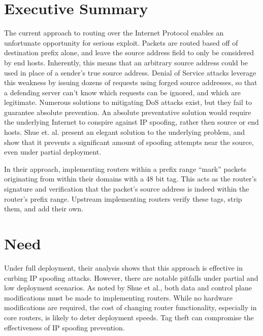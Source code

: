 \documentclass[12pt]{article} %
\begin{document}

\newpage %



\section{Executive Summary}
	The current approach to routing over the Internet Protocol enables an unfortunate opportunity for serious exploit. Packets are routed based off of destination prefix alone, and leave the source address field to only be considered by end hosts. Inherently, this means that an arbitrary source address could be used in place of a sender's true source address. Denial of Service attacks leverage this weakness by issuing dozens of requests using forged source addresses, so that a defending server can't know which requests can be ignored, and which are legitimate. Numerous solutions to mitigating DoS attacks exist, but they fail to guarantee absolute prevention. An absolute preventative solution would require the underlying Internet to conspire against IP spoofing, rather then source or end hosts. Shue et. al. present an elegant solution to the underlying problem, and show that it prevents a significant amount of spoofing attempts near the source, even under partial deployment\cite{Shue20081567}.

	In their approach, implementing routers within a prefix range ``mark'' packets originating from within their domains with a 48 bit tag. This acts as the router's signature and verification that the packet's source address is indeed within the router's prefix range. Upstream implementing routers verify these tags, strip them, and add their own.

\section{Need}
	Under full deployment, their analysis shows that this approach is effective in curbing IP spoofing attacks. However, there are notable pitfalls under partial and low deployment scenarios. As noted by Shue et al., both data and control plane modifications must be made to implementing routers. While no hardware modifications are required, the cost of changing router functionality, especially in core routers, is likely to deter deployment speeds. Tag theft can compromise the effectiveness of IP spoofing prevention.
\end{document}
